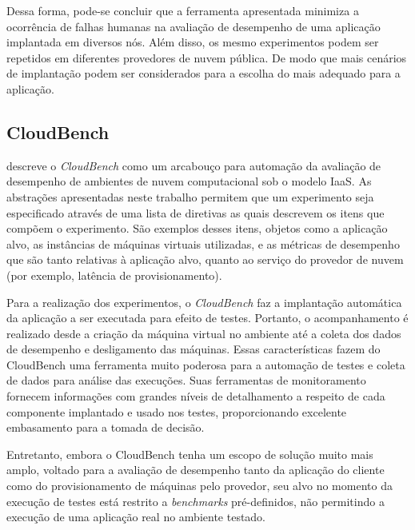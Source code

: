 Dessa forma, pode-se concluir que a ferramenta apresentada minimiza a ocorrência de falhas humanas na avaliação de desempenho de uma aplicação implantada em diversos nós. Além disso, os mesmo experimentos podem ser repetidos em diferentes provedores de nuvem pública. De modo que mais cenários de implantação podem ser considerados para a escolha do mais adequado para a aplicação.

\subsection{CloudBench}
\cite{silva2013cloudbench} descreve o \textit{CloudBench} como um arcabouço para automação da avaliação de desempenho de ambientes de nuvem computacional sob o modelo IaaS. As abstrações apresentadas neste trabalho permitem que um experimento seja especificado através de uma lista de diretivas as quais descrevem os itens que compõem o experimento. São exemplos desses itens, objetos como a aplicação alvo, as instâncias de máquinas virtuais utilizadas, e as métricas de desempenho que são tanto relativas à aplicação alvo, quanto ao serviço do provedor de nuvem (por exemplo, latência de provisionamento).

Para a realização dos experimentos, o \textit{CloudBench} faz a implantação automática da aplicação a ser executada para efeito de testes. Portanto, o acompanhamento é realizado desde a criação da máquina virtual no ambiente até a coleta dos dados de desempenho e desligamento das máquinas. Essas características fazem do CloudBench uma ferramenta muito poderosa para a
automação de testes e coleta de dados para análise das execuções. Suas ferramentas
de monitoramento fornecem informações com grandes níveis de detalhamento a respeito
de cada componente implantado e usado nos testes, proporcionando excelente embasamento
para a tomada de decisão.

Entretanto, embora o CloudBench tenha um escopo de solução muito mais amplo, 
voltado para a avaliação de desempenho tanto da aplicação do cliente como do 
provisionamento de máquinas pelo provedor, seu alvo no momento da execução de 
testes está restrito a \textit{benchmarks} pré-definidos, não permitindo a execução de 
uma aplicação real no ambiente testado.

